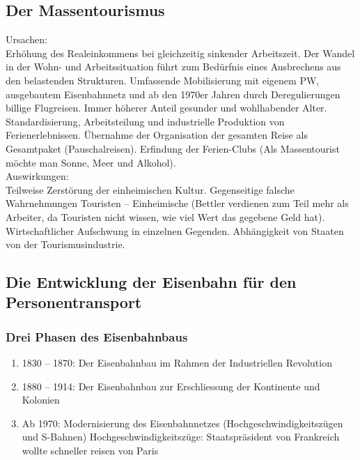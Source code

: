 \documentclass[10pt, openright=true]{scrartcl}
\begin{document}
\subsection{Der Massentourismus}
Ursachen: \\ Erhöhung des Realeinkommens bei gleichzeitig sinkender Arbeitszeit. Der Wandel in der Wohn- und Arbeitssituation führt zum Bedürfnis eines Ausbrechens aus den belastenden Strukturen. Umfassende Mobilisierung mit eigenem PW, ausgebautem Eisenbahnnetz und ab den 1970er Jahren durch Deregulierungen billige Flugreisen. Immer höherer Anteil gesunder und wohlhabender Alter. Standardisierung, Arbeitsteilung und industrielle Produktion von Ferienerlebnissen. Übernahme der Organisation der gesamten Reise als Gesamtpaket (Pauschalreisen). Erfindung der Ferien-Clubs (Als Massentourist möchte man Sonne, Meer und Alkohol).\\ Auswirkungen: \\ Teilweise Zerstörung der einheimischen Kultur. Gegenseitige falsche Wahrnehmungen Touristen – Einheimische (Bettler verdienen zum Teil mehr als Arbeiter, da Touristen nicht wissen, wie viel Wert das gegebene Geld hat). Wirtschaftlicher Aufschwung in einzelnen Gegenden. Abhängigkeit von Staaten von der Tourismusindustrie.
\subsection{Die Entwicklung der Eisenbahn für den Personentransport}
\subsubsection{Drei Phasen des Eisenbahnbaus}
\begin{enumerate}
\item 1830 – 1870: Der Eisenbahnbau im Rahmen der Industriellen Revolution
\item 1880 – 1914: Der Eisenbahnbau zur Erschliessung der Kontinente und Kolonien
\item Ab 1970: Modernisierung des Eisenbahnnetzes (Hochgeschwindigkeitszügen und S-Bahnen) \newline Hochgeschwindigkeitszüge: Staatspräsident von Frankreich wollte schneller reisen von Paris \vspace{-0.2cm}
\end{enumerate}
\end{document}
